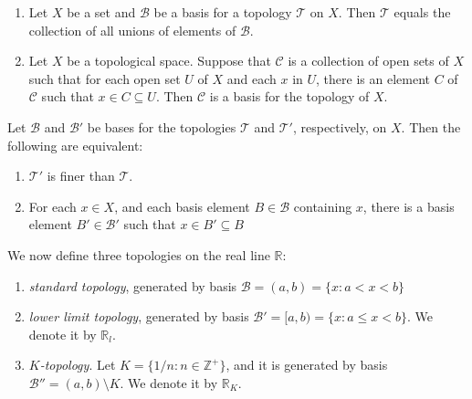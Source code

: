\begin{lemma}
  \begin{enumerate}
    \item Let \( X \) be a set and \( \mathcal{B} \) be a basis for a topology
      \( \mathcal{T} \) on \( X \). Then \( \mathcal{T} \) equals the collection
      of all unions of elements of \( \mathcal{B} \).
    \item Let \( X \) be a topological space. Suppose that \( \mathcal{C} \) is
      a collection of open sets of \( X \) such that for each open set \( U \)
      of \( X \) and each \( x \) in \( U \), there is an element \( C \) of \(
      \mathcal{C} \) such that \( x \in C \subseteq U \). Then \( \mathcal{C} \)
      is a basis for the topology of \( X \).
  \end{enumerate}
\end{lemma}

\begin{proposition}
  Let \( \mathcal{B} \) and \( \mathcal{B}' \) be bases for the topologies \(
  \mathcal{T} \) and \( \mathcal{T}' \), respectively, on \( X \). Then the
  following are equivalent:
  \begin{enumerate}
    \item \( \mathcal{T}' \) is finer than \( \mathcal{T} \).
    \item For each \( x \in X \), and each basis element \( B \in \mathcal{B} \)
      containing \( x \), there is a basis element \( B' \in \mathcal{B}' \)
      such that \( x \in B' \subseteq B \)
  \end{enumerate}
\end{proposition}

\begin{example}
  We now define three topologies on the real line \( \mathbb{R} \):
  \begin{enumerate}
    \item \emph{standard topology}, generated by basis $\mathcal{B} = (a, b) =
      \{ x: a < x < b \}$
    \item \emph{lower limit topology}, generated by basis $\mathcal{B'} = [a, b)
      = \{ x: a \leq x < b \}$. We denote it by \( \mathbb{R}_l \).
    \item \emph{$K$-topology}. Let $K = \{ 1 / n: n \in \mathbb{Z}^+ \}$, and it
      is generated by basis $\mathcal{B''} = (a, b) \setminus K$. We denote it
      by \( \mathbb{R}_K \).
  \end{enumerate}
\end{example}

